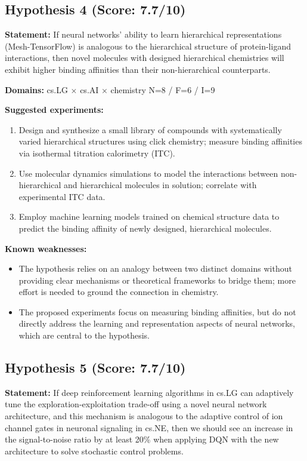 \documentclass[12pt,a4paper]{article}
\begin{document}
\subsection*{Hypothesis 4 (Score: 7.7/10)}

\textbf{Statement:} If neural networks' ability to learn hierarchical representations (Mesh-TensorFlow) is analogous to the hierarchical structure of protein-ligand interactions, then novel molecules with designed hierarchical chemistries will exhibit higher binding affinities than their non-hierarchical counterparts.

\noindent\textbf{Domains:} cs.LG $\times$ cs.AI $\times$ chemistry
\hspace{1em} N=8 / F=6 / I=9

\textbf{Suggested experiments:}
\begin{enumerate}
  \item Design and synthesize a small library of compounds with systematically varied hierarchical structures using click chemistry; measure binding affinities via isothermal titration calorimetry (ITC).
  \item Use molecular dynamics simulations to model the interactions between non-hierarchical and hierarchical molecules in solution; correlate with experimental ITC data.
  \item Employ machine learning models trained on chemical structure data to predict the binding affinity of newly designed, hierarchical molecules.
\end{enumerate}

\textbf{Known weaknesses:}
\begin{itemize}
  \item The hypothesis relies on an analogy between two distinct domains without providing clear mechanisms or theoretical frameworks to bridge them; more effort is needed to ground the connection in chemistry.
  \item The proposed experiments focus on measuring binding affinities, but do not directly address the learning and representation aspects of neural networks, which are central to the hypothesis.
\end{itemize}
\subsection*{Hypothesis 5 (Score: 7.7/10)}

\textbf{Statement:} If deep reinforcement learning algorithms in cs.LG can adaptively tune the exploration-exploitation trade-off using a novel neural network architecture, and this mechanism is analogous to the adaptive control of ion channel gates in neuronal signaling in cs.NE, then we should see an increase in the signal-to-noise ratio by at least 20\% when applying DQN with the new architecture to solve stochastic control problems.
\end{document}
